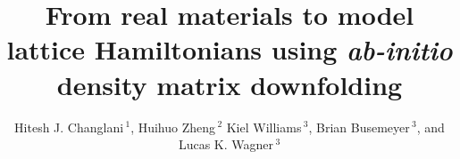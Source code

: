 \documentclass[utf8,latin9]{frontiersFPHY}
\renewcommand\abstractname{}
\def\firstAuthorLast{Hitesh J. Changlani et al} %
\def\Authors{Hitesh J. Changlani\,$^{1}$, Huihuo Zheng\,$^{2}$ Kiel Williams\,$^{3}$, Brian Busemeyer\,$^{3}$, and Lucas K. Wagner\,$^{3}$}
\begin{document}
\onecolumn
{}

\title[Ab initio density matrix downfolding]{From real materials to model lattice Hamiltonians using \textit{ab-initio} density matrix downfolding}
\author[\firstAuthorLast ]{\Authors} %
\address{} %
\correspondance{} %
\extraAuth{}
\maketitle
\end{document}
